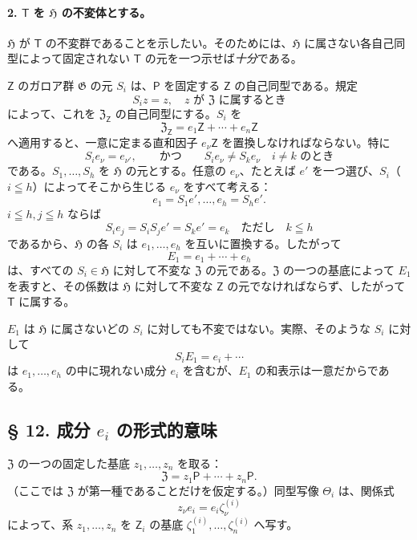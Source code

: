 \paragraph{2. $\mathsf T$ を $\mathfrak H$ の不変体とする。}
$\mathfrak H$ が $\mathsf T$ の不変群であることを示したい。そのためには、$\mathfrak H$ に属さない各自己同型によって固定されない $\mathsf T$ の元を一つ示せば\emph{十分}である。

$\mathsf Z$ のガロア群 $\mathfrak G$ の元 $S_i$ は、$\mathsf P$ を固定する $\mathsf Z$ の自己同型である。規定
\[
S_i z=z,\quad \text{$z$ が $\mathfrak Z$ に属するとき}
\]
によって、これを $\mathfrak Z_{\mathsf Z}$ の自己同型にする。$S_i$ を
\[
\mathfrak Z_{\mathsf Z}=e_1\mathsf Z+\cdots+e_n\mathsf Z
\]
へ適用すると、一意に定まる直和因子 $e_\nu\mathsf Z$ を置換しなければならない。特に
\[
S_i e_\nu=e_{\nu'},\qquad\text{かつ}\qquad S_i e_\nu\ne S_k e_\nu
\quad\text{$i\ne k$ のとき}
\]
である。$S_1,\ldots,S_h$ を $\mathfrak H$ の元とする。任意の $e_\nu$、たとえば $e'$ を一つ選び、$S_i$（$i\leqq h$）によってそこから生じる $e_\nu$ をすべて考える：
\[
e_1=S_1e',\ldots,e_h=S_he'.
\]
$i\leqq h,j\leqq h$ ならば
\[
S_i e_j=S_iS_j e'=S_ke'=e_k \quad \text{ただし}\quad k\leqq h
\]
であるから、$\mathfrak H$ の各 $S_i$ は $e_1,\ldots,e_h$ を互いに置換する。したがって
\[
E_1=e_1+\cdots+e_h
\]
は、すべての $S_i\in\mathfrak H$ に対して不変な $\mathfrak Z$ の元である。$\mathfrak Z$ の一つの基底によって $E_1$ を表すと、その係数は $\mathfrak H$ に対して不変な $\mathsf Z$ の元でなければならず、したがって $\mathsf T$ に属する。

$E_1$ は $\mathfrak H$ に属さないどの $S_i$ に対しても不変ではない。実際、そのような $S_i$ に対して
\[
S_i E_1=e_i+\cdots
\]
は $e_1,\ldots,e_h$ の中に現れない成分 $e_i$ を含むが、$E_1$ の和表示は一意だからである。

\subsection*{§ 12. 成分 $e_i$ の形式的意味}\label{die-formale-bedeutung-der-komponenten-ei}

$\mathfrak Z$ の一つの固定した基底 $z_1,\ldots,z_n$ を取る：
\[
\mathfrak Z=z_1\mathsf P+\cdots+z_n\mathsf P.
\]
（ここでは $\mathfrak Z$ が第一種であることだけを仮定する。）同型写像 $\Theta_i$ は、関係式
\[
z_\nu e_i=e_i\zeta_\nu^{(i)}
\]
によって、系 $z_1,\ldots,z_n$ を $\mathsf Z_i$ の基底 $\zeta_1^{(i)},\ldots,\zeta_n^{(i)}$ へ写す。

